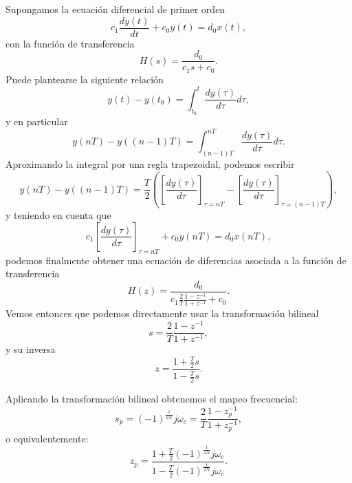 Supongamos la ecuaci\'{o}n diferencial de primer orden 
\begin{equation}
	c_{1}\frac{dy\left( t\right) }{dt}+c_{0}y\left( t\right) =d_{0}x\left( t\right) ,
\end{equation}
con la funci\'{o}n de transferencia 
\begin{equation}
	H\left( s\right) =\frac{d_{0}}{c_{1}s+c_{0}}.
\end{equation}
Puede plantearse la siguiente relaci\'{o}n 
\begin{equation}
	y\left( t\right) -y\left( t_{0}\right) =\int_{t_{0}}^{t}\frac{dy\left( \tau \right) }{d\tau }d\tau ,
\end{equation}
y en particular 
\begin{equation}
	y\left( nT\right) -y\left( \left( n-1\right) T\right) =\int_{\left( n-1\right) T}^{nT}\frac{dy\left( \tau \right) }{d\tau }d\tau .
\end{equation}
Aproximando la integral por una regla trapezoidal, podemos escribir 
\begin{equation}
	y\left( nT\right) -y\left( \left( n-1\right) T\right) =\frac{T}{2}\left( 
	\left[ \frac{dy\left( \tau \right) }{d\tau }\right] _{\tau =nT}-\left[ 
	\frac{dy\left( \tau \right) }{d\tau }\right] _{\tau =\left( n-1\right) T}\right) ,
\end{equation}
y teniendo en cuenta que 
\begin{equation}
	c_{1}\left[ \frac{dy\left( \tau \right) }{d\tau }\right] _{\tau =nT}+c_{0}y\left( nT\right) =d_{0}x\left( nT\right) ,
\end{equation}
podemos finalmente obtener una ecuaci\'{o}n de diferencias asociada a la funci\'{o}n de transferencia 
\begin{equation}
	H\left( z\right) =\frac{d_{0}}{c_{1}\frac{2}{T}\frac{1-z^{-1}}{1+z^{-1}} + c_{0}}.
\end{equation}
Vemos entonces que podemos directamente usar la transformaci\'{o}n bilineal 
\begin{equation}
	s=\frac{2}{T}\frac{1-z^{-1}}{1+z^{-1}},
\end{equation}
y su inversa
\begin{equation}
	z=\frac{1+\frac{T}{2}s}{1-\frac{T}{2}s}.
\end{equation}

Aplicando la transformaci\'{o}n bilineal obtenemos el mapeo frecuencial:
\begin{equation}
	s_{p}=\left( -1\right) ^{\frac{1}{2N}}j\omega _{c}=\frac{2}{T}\frac{1-z_{p}^{-1}}{1+z_{p}^{-1}},
\end{equation}
o equivalentemente:
\begin{equation}
	z_{p}=\frac{1+\frac{T}{2} \left( -1\right)^{\frac{1}{2N}}j\omega _{c}}{1-\frac{T}{2}\left( -1\right) ^{\frac{1}{2N}}j\omega _{c}}.
\end{equation}

